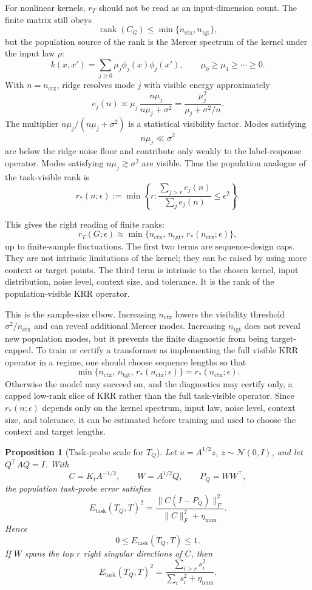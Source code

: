 \documentclass[11pt]{article}
\newtheorem{proposition}{Proposition}
\begin{document}
For nonlinear kernels, \(r_T\) should not be read as an input-dimension count. The finite matrix
still obeys
\[
\operatorname{rank}(C_G)\le \min\{n_{\mathrm{ctx}},n_{\mathrm{tgt}}\},
\]
but the population source of the rank is the Mercer spectrum of the kernel under the input law
\(\rho\):
\[
k(x,x')=\sum_{j\ge0}\mu_j\phi_j(x)\phi_j(x'),
\qquad
\mu_0\ge\mu_1\ge\cdots\ge0.
\]
With \(n=n_{\mathrm{ctx}}\), ridge resolves mode \(j\) with visible energy approximately
\[
e_j(n)
\asymp
\mu_j\,\frac{n\mu_j}{n\mu_j+\sigma^2}
=
\frac{\mu_j^2}{\mu_j+\sigma^2/n}.
\]
The multiplier \(n\mu_j/(n\mu_j+\sigma^2)\) is a statistical visibility factor. Modes satisfying
\[
n\mu_j\ll\sigma^2
\]
are below the ridge noise floor and contribute only weakly to the label-response operator. Modes
satisfying \(n\mu_j\gtrsim\sigma^2\) are visible. Thus the population analogue of the task-visible
rank is
\[
r_*(n;\epsilon)
:=
\min\left\{
r:
\frac{\sum_{j>r}e_j(n)}{\sum_j e_j(n)}
\le \epsilon^2
\right\}.
\]

This gives the right reading of finite ranks:
\[
r_T(G;\epsilon)
\approx
\min\{n_{\mathrm{ctx}},\,n_{\mathrm{tgt}},\,r_*(n_{\mathrm{ctx}};\epsilon)\},
\]
up to finite-sample fluctuations. The first two terms are sequence-design caps. They are not
intrinsic limitations of the kernel; they can be raised by using more context or target points. The
third term is intrinsic to the chosen kernel, input distribution, noise level, context size, and
tolerance. It is the rank of the population-visible KRR operator.

This is the sample-size elbow. Increasing \(n_{\mathrm{ctx}}\) lowers the visibility threshold
\(\sigma^2/n_{\mathrm{ctx}}\) and can reveal additional Mercer modes. Increasing
\(n_{\mathrm{tgt}}\) does not reveal new population modes, but it prevents the finite diagnostic from
being target-capped. To train or certify a transformer as implementing the full visible KRR operator
in a regime, one should choose sequence lengths so that
\[
\min\{n_{\mathrm{ctx}},\,n_{\mathrm{tgt}},\,r_*(n_{\mathrm{ctx}};\epsilon)\}
=
r_*(n_{\mathrm{ctx}};\epsilon).
\]
Otherwise the model may succeed on, and the diagnostics may certify only, a capped low-rank slice
of KRR rather than the full task-visible operator. Since \(r_*(n;\epsilon)\) depends only on the
kernel spectrum, input law, noise level, context size, and tolerance, it can be estimated before
training and used to choose the context and target lengths.

\begin{proposition}[Task-probe scale for \(T_Q\)]
Let \(u=A^{1/2}z\), \(z\sim\mathcal{N}(0,I)\), and let \(Q^\top A Q=I\). With
\[
C=K_tA^{-1/2},\qquad W=A^{1/2}Q,\qquad P_Q=WW^\top,
\]
the population task-probe error satisfies
\[
E_{\mathrm{task}}(T_Q,T)^2
=
\frac{\|C(I-P_Q)\|_F^2}{\|C\|_F^2+\eta_{\mathrm{num}}}.
\]
Hence
\[
0\le E_{\mathrm{task}}(T_Q,T)\le 1.
\]
If \(W\) spans the top \(r\) right singular directions of \(C\), then
\[
E_{\mathrm{task}}(T_Q,T)^2
=
\frac{\sum_{i>r}s_i^2}{\sum_i s_i^2+\eta_{\mathrm{num}}}.
\]
\end{proposition}
\end{document}
